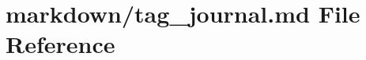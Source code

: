 \hypertarget{tag__journal_8md}{}\section{markdown/tag\+\_\+journal.md File Reference}
\label{tag__journal_8md}
